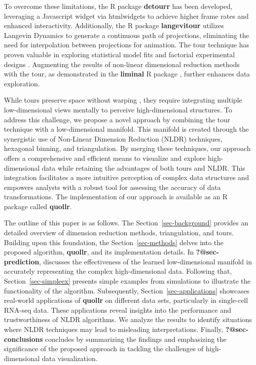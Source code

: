\documentclass[
  12pt]{article}
\begin{document}
To overcome these limitations, the R package \textbf{detourr}
\citep{article22} has been developed, leveraging a Javascript widget via
htmlwidgets \citep{Ramnath2023} to achieve higher frame rates and
enhanced interactivity. Additionally, the R package \textbf{langevitour}
\citep{article09} utilizes Langevin Dynamics to generate a continuous
path of projections, eliminating the need for interpolation between
projections for animation. The tour technique has proven valuable in
exploring statistical model fits \citep{article58} and factorial
experimental designs \citep{article59}. Augmenting the results of
non-linear dimensional reduction methods with the tour, as demonstrated
in the \textbf{liminal} R package \citep{article21}, further enhances
data exploration.

While tours \citep{Asimov1985} preserve space without warping
\citep{lee2021review}, they require integrating multiple low-dimensional
views mentally to perceive high-dimensional structures. To address this
challenge, we propose a novel approach by combining the tour technique
with a low-dimensional manifold. This manifold is created through the
synergistic use of Non-Linear Dimension Reduction (NLDR) techniques,
hexagonal binning, and triangulation. By merging these techniques, our
approach offers a comprehensive and efficient means to visualize and
explore high-dimensional data while retaining the advantages of both
tours and NLDR. This integration facilitates a more intuitive perception
of complex data structures and empowers analysts with a robust tool for
assessing the accuracy of data transformations. The implementation of
our approach is available as an R package called \textbf{quollr}.

The outline of this paper is as follows. The
Section~\ref{sec-background} provides an detailed overview of dimension
reduction methods, triangulation, and tours. Building upon this
foundation, the Section~\ref{sec-methods} delves into the proposed
algorithm, \textbf{quollr}, and its implementation details. In
\textbf{?@sec-prediction}, discusses the effectiveness of the learned
low-dimensional manifold in accurately representing the complex
high-dimensional data. Following that, Section~\ref{sec-simpleex}
presents simple examples from simulations to illustrate the
functionality of the algorithm. Subsequently,
Section~\ref{sec-applications} showcases real-world applications of
\textbf{quollr} on different data sets, particularly in single-cell
RNA-seq data. These applications reveal insights into the performance
and trustworthiness of NLDR algorithms. We analyze the results to
identify situations where NLDR techniques may lead to misleading
interpretations. Finally, \textbf{?@sec-conclusions} concludes by
summarizing the findings and emphasizing the significance of the
proposed approach in tackling the challenges of high-dimensional data
visualization.
\end{document}
